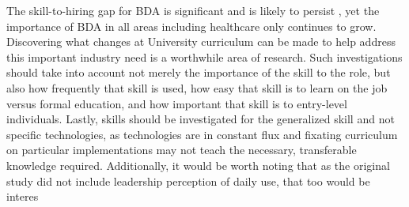 The skill-to-hiring gap for BDA is significant and is likely to persist \parencite{gartnerTrendsImpactingCloud2020}, yet the importance of BDA in all areas including healthcare only continues to grow. Discovering what changes at University curriculum can be made to help address this important industry need is a worthwhile area of research. Such investigations should take into account not merely the importance of the skill to the role, but also how frequently that skill is used, how easy that skill is to learn on the job versus formal education, and how important that skill is to entry-level individuals. Lastly, skills should be investigated for the generalized skill and not specific technologies, as technologies are in constant flux and fixating curriculum on particular implementations may not teach the necessary, transferable knowledge required.
Additionally, it would be worth noting that as the original study did not include leadership perception of daily use, that too would be interes
